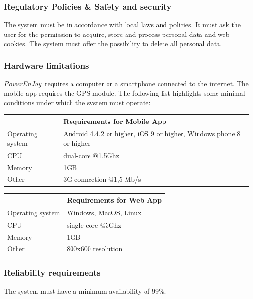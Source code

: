 \documentclass{article}
\newcommand{\pej}{\mbox{\normalfont\itshape PowerEnJoy }}
\begin{document}
		\subsubsection{Regulatory Policies \& Safety and security}
		The system must be in accordance with local laws and policies. It must ask the user for the permission to acquire, store and process personal data and web cookies. The system must offer the possibility to delete all personal data.
		\subsubsection{Hardware limitations}
		\pej requires a computer or a smartphone connected to the internet. The mobile app requires the GPS module. The following list highlights some minimal conditions under which the system must operate: \\
		
			\begin{center}
				\begin{tabular}{ | l | p{5cm} |}
					\hline
					& Requirements for Mobile App\\ \hline
					Operating system & Android 4.4.2 or higher, iOS 9 or higher, Windows phone 8 or higher\\\hline
					CPU & dual-core @1.5Ghz\\\hline
					Memory & 1GB \\\hline
					Other & 3G connection @1,5 Mb/s \\\hline
				\end{tabular}
			\end{center}
			
			\begin{center}
				\begin{tabular}{ | l | p{5cm} |}
					\hline
					& Requirements for Web App\\ \hline
					Operating system & Windows, MacOS, Linux\\\hline
					CPU & single-core @3Ghz \\\hline
					Memory & 1GB \\\hline
					Other & 800x600 resolution \\\hline
				\end{tabular}
			\end{center}
		\subsubsection{Reliability requirements}
		The system must have a minimum availability of 99\%.
\end{document}

